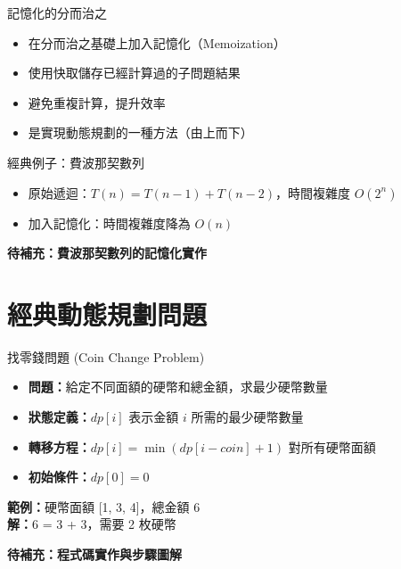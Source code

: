\documentclass{beamer}
\begin{document}
\begin{frame}{記憶化的分而治之}
\begin{itemize}
    \item 在分而治之基礎上加入記憶化（Memoization）
    \item 使用快取儲存已經計算過的子問題結果
    \item 避免重複計算，提升效率
    \item 是實現動態規劃的一種方法（由上而下）
\end{itemize}

\vspace{1em}
\begin{block}{經典例子：費波那契數列}
\begin{itemize}
    \item 原始遞迴：$T(n) = T(n-1) + T(n-2)$，時間複雜度 $O(2^n)$
    \item 加入記憶化：時間複雜度降為 $O(n)$
\end{itemize}
\end{block}

\vspace{1em}
\textbf{待補充：費波那契數列的記憶化實作}
\end{frame}

\section{經典動態規劃問題}

\begin{frame}{找零錢問題 (Coin Change Problem)}
\begin{itemize}
    \item \textbf{問題：}給定不同面額的硬幣和總金額，求最少硬幣數量
    \item \textbf{狀態定義：}$dp[i]$ 表示金額 $i$ 所需的最少硬幣數量
    \item \textbf{轉移方程：}$dp[i] = \min(dp[i-coin] + 1)$ 對所有硬幣面額
    \item \textbf{初始條件：}$dp[0] = 0$
\end{itemize}

\vspace{1em}
\textbf{範例：}硬幣面額 [1, 3, 4]，總金額 6\\
\textbf{解：}6 = 3 + 3，需要 2 枚硬幣

\vspace{1em}
\textbf{待補充：程式碼實作與步驟圖解}
\end{frame}
\end{document}
